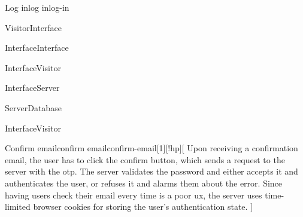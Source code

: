\begin{toexclude}
\begin{sdfig}{Log in}{log in}{log-in}
\begin{umlcall}[op={Log in}]{Visitor}{Interface}
\begin{umlcall}[op={Validate}]{Interface}{Interface}
\begin{umlfragment}[type=alt, label=valid]
\begin{umlcall}[type=return,op={Loading}]{Interface}{Visitor}
\begin{umlcall}[op={Log in}]{Interface}{Server}
\begin{umlcall}[op={Has user}]{Server}{Database}
\begin{umlfragment}[type=alt, label=true]
                \end{umlfragment}
              \end{umlcall}
            \end{umlcall}
          \end{umlcall}
          \umlfpart[else]
          \begin{umlcall}[type=return,op={Show error}]{Interface}{Visitor}
          \end{umlcall}
        \end{umlfragment}
      \end{umlcall}
    \end{umlcall}
  \end{sdfig}
\end{toexclude}


\begin{sdfig}{Confirm email}{confirm email}{confirm-email}[1][!hp][
    Upon receiving a confirmation email, the user has to click the confirm button, which sends a request to the server with the \acrshort{otp}.
    The server validates the password and either accepts it and authenticates the user, or refuses it and alarms them about the error.
    Since having users check their email every time is a poor \acrfull{ux}, the server uses time-limited browser cookies for storing the user's authentication state.
  ]


\end{sdfig}
